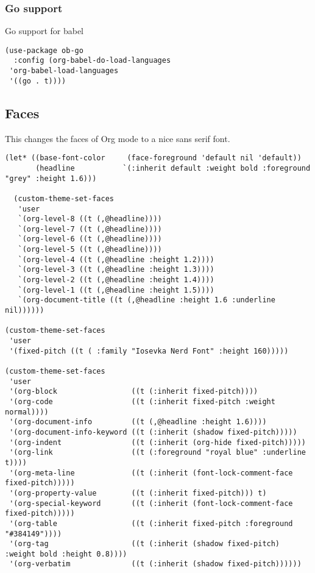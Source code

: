 \documentclass[11pt]{article}
\begin{document}
\subsubsection*{Go support}
\label{sec:org1077c5e}

Go support for babel

\begin{verbatim}
(use-package ob-go
  :config (org-babel-do-load-languages
 'org-babel-load-languages
 '((go . t))))
\end{verbatim}

\subsection*{Faces}
\label{sec:org0ec189f}

This changes the faces of Org mode to a nice sans serif font.

\begin{verbatim}
(let* ((base-font-color     (face-foreground 'default nil 'default))
       (headline           `(:inherit default :weight bold :foreground "grey" :height 1.6)))

  (custom-theme-set-faces
   'user
   `(org-level-8 ((t (,@headline))))
   `(org-level-7 ((t (,@headline))))
   `(org-level-6 ((t (,@headline))))
   `(org-level-5 ((t (,@headline))))
   `(org-level-4 ((t (,@headline :height 1.2))))
   `(org-level-3 ((t (,@headline :height 1.3))))
   `(org-level-2 ((t (,@headline :height 1.4))))
   `(org-level-1 ((t (,@headline :height 1.5))))
   `(org-document-title ((t (,@headline :height 1.6 :underline nil))))))

(custom-theme-set-faces
 'user
 '(fixed-pitch ((t ( :family "Iosevka Nerd Font" :height 160)))))

(custom-theme-set-faces
 'user
 '(org-block                 ((t (:inherit fixed-pitch))))
 '(org-code                  ((t (:inherit fixed-pitch :weight normal))))
 '(org-document-info         ((t (,@headline :height 1.6))))
 '(org-document-info-keyword ((t (:inherit (shadow fixed-pitch)))))
 '(org-indent                ((t (:inherit (org-hide fixed-pitch)))))
 '(org-link                  ((t (:foreground "royal blue" :underline t))))
 '(org-meta-line             ((t (:inherit (font-lock-comment-face fixed-pitch)))))
 '(org-property-value        ((t (:inherit fixed-pitch))) t)
 '(org-special-keyword       ((t (:inherit (font-lock-comment-face fixed-pitch)))))
 '(org-table                 ((t (:inherit fixed-pitch :foreground "#384149"))))
 '(org-tag                   ((t (:inherit (shadow fixed-pitch) :weight bold :height 0.8))))
 '(org-verbatim              ((t (:inherit (shadow fixed-pitch))))))
\end{verbatim}
\end{document}
